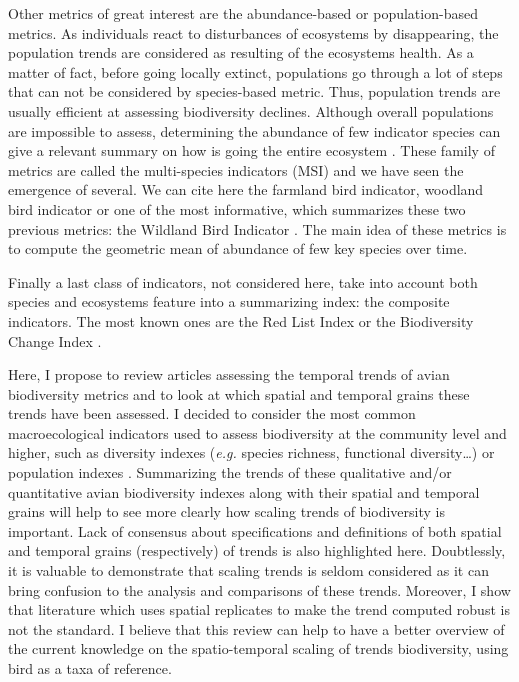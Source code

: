\documentclass[
  12pt,
  oneside]{report}
\begin{document}
Other metrics of great interest are the abundance-based or population-based metrics. As individuals react to disturbances of ecosystems by disappearing, the population trends are considered as resulting of the ecosystems health. As a matter of fact, before going locally extinct, populations go through a lot of steps that can not be considered by species-based metric. Thus, population trends are usually efficient at assessing biodiversity declines. Although overall populations are impossible to assess, determining the abundance of few indicator species can give a relevant summary on how is going the entire ecosystem \autocite{gregory_developing_2005}. These family of metrics are called the multi-species indicators (MSI) and we have seen the emergence of several. We can cite here the farmland bird indicator, woodland bird indicator or one of the most informative, which summarizes these two previous metrics: the Wildland Bird Indicator \autocite{gregory_generation_1999,gregory_wild_2010}. The main idea of these metrics is to compute the geometric mean of abundance of few key species over time.

Finally a last class of indicators, not considered here, take into account both species and ecosystems feature into a summarizing index: the composite indicators. The most known ones are the Red List Index \autocite{butchart_improvements_2007,butchart_using_2005,butchart_measuring_2004} or the Biodiversity Change Index \autocite{normander_indicator_2012}.

Here, I propose to review articles assessing the temporal trends of avian biodiversity metrics and to look at which spatial and temporal grains these trends have been assessed. I decided to consider the most common macroecological indicators used to assess biodiversity at the community level and higher, such as diversity indexes (\emph{e.g.} species richness, functional diversity\ldots) or population indexes \autocite{mcgill_fifteen_2015}. Summarizing the trends of these qualitative and/or quantitative avian biodiversity indexes along with their spatial and temporal grains will help to see more clearly how scaling trends of biodiversity is important. Lack of consensus about specifications and definitions of both spatial and temporal grains (respectively) of trends is also highlighted here. Doubtlessly, it is valuable to demonstrate that scaling trends is seldom considered as it can bring confusion to the analysis and comparisons of these trends. Moreover, I show that literature which uses spatial replicates to make the trend computed robust is not the standard. I believe that this review can help to have a better overview of the current knowledge on the spatio-temporal scaling of trends biodiversity, using bird as a taxa of reference.
\end{document}
